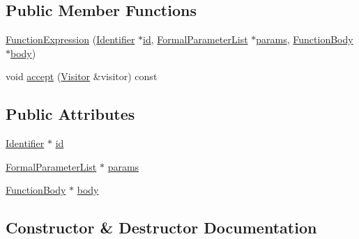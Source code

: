 \subsection*{Public Member Functions}
\begin{DoxyCompactItemize}
\item 
\hyperlink{structast_1_1_function_expression_a378f9e09b02d457e88b4b71e169e2154}{Function\+Expression} (\hyperlink{structast_1_1_identifier}{Identifier} $\ast$\hyperlink{structast_1_1_function_expression_af3439c30bbde4463bc71158f24b1dd13}{id}, \hyperlink{structast_1_1_formal_parameter_list}{Formal\+Parameter\+List} $\ast$\hyperlink{structast_1_1_function_expression_a83a7dd9fe27f5e9f6357f398d52476e3}{params}, \hyperlink{structast_1_1_function_body}{Function\+Body} $\ast$\hyperlink{structast_1_1_function_expression_a708305d4b4f5421d1dfcbe5edb15374c}{body})
\item 
void \hyperlink{structast_1_1_function_expression_aa847bb46bcd639d92e0fd2bc0bcf0a3f}{accept} (\hyperlink{structast_1_1_visitor}{Visitor} \&visitor) const
\end{DoxyCompactItemize}
\subsection*{Public Attributes}
\begin{DoxyCompactItemize}
\item 
\hyperlink{structast_1_1_identifier}{Identifier} $\ast$ \hyperlink{structast_1_1_function_expression_af3439c30bbde4463bc71158f24b1dd13}{id}
\item 
\hyperlink{structast_1_1_formal_parameter_list}{Formal\+Parameter\+List} $\ast$ \hyperlink{structast_1_1_function_expression_a83a7dd9fe27f5e9f6357f398d52476e3}{params}
\item 
\hyperlink{structast_1_1_function_body}{Function\+Body} $\ast$ \hyperlink{structast_1_1_function_expression_a708305d4b4f5421d1dfcbe5edb15374c}{body}
\end{DoxyCompactItemize}


\subsection{Constructor \& Destructor Documentation}
\mbox{\label{structast_1_1_function_expression_a378f9e09b02d457e88b4b71e169e2154}} 

